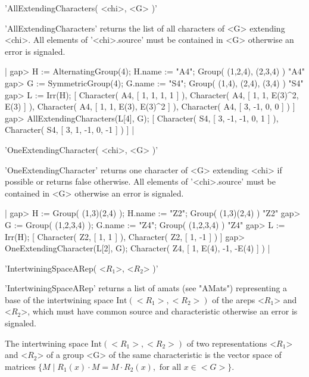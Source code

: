 
'AllExtendingCharacters( <chi>, <G> )'

'AllExtendingCharacters' returns the list of all characters 
of <G> extending <chi>. All elements of '<chi>.source' must be 
contained in <G> otherwise an error is signaled.

|    gap> H := AlternatingGroup(4); H.name := "A4";
    Group( (1,2,4), (2,3,4) )
    "A4"
    gap> G := SymmetricGroup(4); G.name := "S4";
    Group( (1,4), (2,4), (3,4) )
    "S4"
    gap> L := Irr(H);
    [ Character( A4, [ 1, 1, 1, 1 ] ), 
      Character( A4, [ 1, 1, E(3)^2, E(3) ] ), 
      Character( A4, [ 1, 1, E(3), E(3)^2 ] ), 
      Character( A4, [ 3, -1, 0, 0 ] ) ]
    gap> AllExtendingCharacters(L[4], G);
    [ Character( S4, [ 3, -1, -1, 0, 1 ] ), 
      Character( S4, [ 3, 1, -1, 0, -1 ] ) ] |


'OneExtendingCharacter( <chi>, <G> )'

'OneExtendingCharacter' returns one character 
of <G> extending <chi> if possible or returns false otherwise. 
All elements of '<chi>.source' must be 
contained in <G> otherwise an error is signaled.

|    gap> H := Group( (1,3)(2,4) ); H.name := "Z2";
    Group( (1,3)(2,4) )
    "Z2"
    gap> G := Group( (1,2,3,4) ); G.name := "Z4";
    Group( (1,2,3,4) )
    "Z4"
    gap> L := Irr(H);
    [ Character( Z2, [ 1, 1 ] ), Character( Z2, [ 1, -1 ] ) ]
    gap> OneExtendingCharacter(L[2], G);
    Character( Z4, [ 1, E(4), -1, -E(4) ] ) |


'IntertwiningSpaceARep( <$R_1$>, <$R_2$> )'

'IntertwiningSpaceARep' returns a list of amats (see "AMats") 
representing a base of the intertwining space $\mbox{Int}(<R_1>, <R_2>)$
of the areps <$R_1$> and <$R_2$>, which must have common source
and characteristic otherwise an error is signaled.

The intertwining space $\mbox{Int}(<R_1>, <R_2>)$ of two representations 
<$R_1$> and <$R_2$> of a group <G> of the same characteristic
is the vector space of matrices 
$\{M\mid R_1(x)\cdot M = M \cdot R_2(x),\mbox{ for all }x\in <G>\}$.

